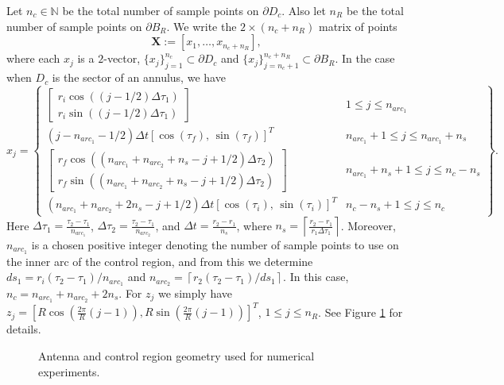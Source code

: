 \documentclass[11pt]{amsart}
\theoremstyle{definition}
\theoremstyle{definition}
\theoremstyle{definition}
\newcommand{\ceiling}[1]{\left\lceil#1\right\rceil}
\newcommand{\paren}[1]{\left ( #1\right )}
\begin{document}
Let $n_{c} \in \mathbb{N}$ be the total number of sample points on $\partial D_{c}$. Also let $n_{R}$ be the total number of sample points on $\partial B_{R}$. We write the $2 \times (n_{c} + n_{R})$ matrix of points
\begin{equation*}
\mathbf{X} := [x_{1}, \ldots, x_{n_{c}+n_{R}}],
\end{equation*}
where each $x_{j}$ is a $2$-vector, $\{x_{j}\}_{j=1}^{n_{c}} \subset \partial D_{c}$ and $\{x_{j}\}_{j=n_{c}+1}^{n_{c} + n_{R}} \subset \partial B_{R}$. In the case when $D_{c}$ is the sector of an annulus, we have
\begin{equation*}
x_{j} = \left\{ \begin{array}{rl}
\left[ \begin{array}{r}
r_{i}\cos\paren{(j-1/2)\Delta \tau_{1}}\\
r_{i}\sin\paren{(j-1/2)\Delta \tau_{1}} \end{array}\right] & 1 \leq j \leq n_{arc_1}\\
(j-n_{arc_1} - 1/2)\Delta t[\cos(\tau_{f}), \, \sin(\tau_{f})]^{T} &  n_{arc_1} + 1 \leq j \leq n_{arc_1} + n_{s}\\
\left[\begin{array}{r} r_{f}\cos\paren{(n_{arc_1}+n_{arc_2}+n_{s}-j+1/2)\Delta \tau_{2}}\\
 r_{f}\sin\paren{(n_{arc_1}+n_{arc_2}+n_{s}-j+1/2)\Delta \tau_{2}} \end{array}\right] & n_{arc_1} + n_{s} + 1 \leq j \leq n_{c} - n_{s}\\
(n_{arc_1}+n_{arc_2} + 2n_{s} - j + 1/2)\Delta t[\cos(\tau_{i}), \,\sin(\tau_{i})]^{T} & n_{c} - n_{s}+ 1 \leq j \leq n_{c} \end{array}\right\}.
\end{equation*}
Here $\Delta \tau_{1} = \frac{\tau_{2} - \tau_{1}}{n_{arc_1}}$, $\Delta \tau_{2} = \frac{\tau_{2} - \tau_{1}}{n_{arc_2}}$, and $\Delta t = \frac{r_{2} - r_{1}}{n_{s}}$, where $n_{s} = \ceiling{\frac{r_{2} - r_{1}}{r_{1}\Delta \tau_{1}}}$. Moreover, $n_{arc_{1}}$ is a chosen positive integer denoting the number of sample points to use on the inner arc of the control region, and from this we determine $ds_1 = r_{i}(\tau_{2} - \tau_{1})/n_{arc_1}$ and $n_{arc_2} = \ceiling{r_{2}(\tau_{2}-\tau_{1})/ds_{1}}$. In this case, $n_{c} = n_{arc_1}+n_{arc_2} + 2n_{s}$. For $z_{j}$ we simply have $z_{j} = [R\cos\paren{\frac{2\pi}{R}(j-1)}, R\sin\paren{\frac{2\pi}{R}(j-1)}]^{T}$, $1 \leq j \leq n_{R}$. See Figure \ref{fig:numericssetup} for details.
\begin{figure}
\centering
\def \svgwidth{0.6\linewidth}

\caption{Antenna and control region geometry used for numerical experiments.}\label{fig:numericssetup}
\end{figure}
\end{document}
